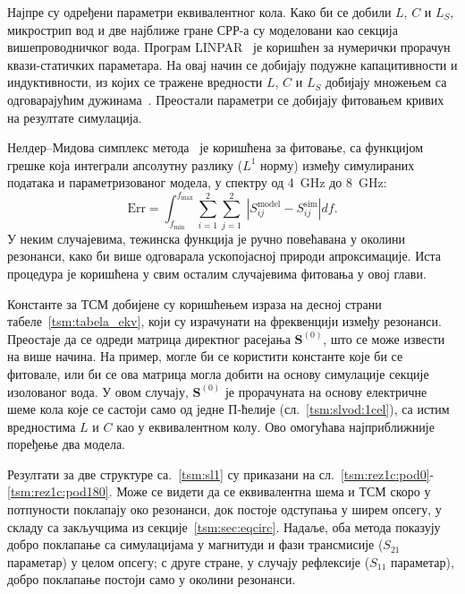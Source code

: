 \documentclass[main.tex]{subfiles}
\begin{document}
Најпре су одређени параметри еквивалентног кола. Како би се добили $L$, $C$ и $L_S$, микрострип вод и две најближе гране СРР-а су моделовани као секција вишепроводничког вода. Програм LINPAR~\cite{djordjevic1999linpar} је коришћен за нумерички прорачун квази-статичких параметара. На овај начин се добијају подужне капацитивности и индуктивности, из којих се тражене вредности $L$, $C$ и $L_S$ добијају множењем са одговарајућим дужинама~\cite{radoman}. Преостали параметри се добијају фитовањем кривих на резултате симулација.

Нелдер--Мидова симплекс метода~\cite{simplex} је коришћена за фитовање, са функцијом грешке која интеграли апсолутну разлику ($L^1$ норму) између симулираних података и параметризованог модела, у спектру од \SI{4}{\giga\hertz} до \SI{8}{\giga\hertz}:
\begin{equation}
\mathrm{Err}=\int_{f_\mathrm{min}}^{f_\mathrm{max}}\sum_{i=1}^2\sum_{j=1}^2\ \left | S_{ij}^\mathrm{model} - S_{ij}^{\mathrm{sim}} \right | df.
\end{equation}
У неким случајевима, тежинска функција је ручно повећавана у околини резонанси, како би више одговарала ускопојасној природи апроксимације. Иста процедура је коришћена у свим осталим случајевима фитовања у овој глави.

Константе за ТСМ добијене су коришћењем израза на десној страни табеле~\ref{tsm:tabela_ekv}, који су израчунати на фреквенцији између резонанси. Преостаје да се одреди матрица директног расејања $\mathbf{S}^{(0)}$, што се може извести на више начина. На пример, могле би се користити константе које би се фитовале, или би се ова матрица могла добити на основу симулације секције изолованог вода. У овом случају, $\mathbf{S}^{(0)}$ је прорачуната на основу електричне шеме кола које се састоји само од једне П-ћелије (сл.~\ref{tsm:slvod:1cel}), са истим вредностима $L$ и $C$ као у еквивалентном колу. Ово омогућава најприближније поређење два модела.

Резултати за две структуре са.~\ref{tsm:sl1} су приказани на сл.~\ref{tsm:rez1c:pod0}-\ref{tsm:rez1c:pod180}. Може се видети да се еквивалентна шема и ТСМ скоро у потпуности поклапају око резонанси, док постоје одступања у ширем опсегу, у складу са закључцима из секције~\ref{tsm:sec:eqcirc}. Надаље, оба метода показују добро поклапање са симулацијама у магнитуди и фази трансмисије ($S_{21}$ параметар) у целом опсегу; с друге стране, у случају рефлексије ($S_{11}$ параметар), добро поклапање постоји само у околини резонанси.
\end{document}
